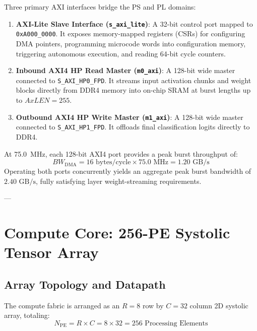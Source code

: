 \documentclass[10pt,journal,compsoc]{IEEEtran}
\begin{document}
Three primary AXI interfaces bridge the PS and PL domains:
\begin{enumerate}
    \item \textbf{AXI-Lite Slave Interface (\texttt{s\_axi\_lite})}: A 32-bit control port mapped to \texttt{0xA000\_0000}. It exposes memory-mapped registers (CSRs) for configuring DMA pointers, programming microcode words into configuration memory, triggering autonomous execution, and reading 64-bit cycle counters.
    \item \textbf{Inbound AXI4 HP Read Master (\texttt{m0\_axi})}: A 128-bit wide master connected to \texttt{S\_AXI\_HP0\_FPD}. It streams input activation chunks and weight blocks directly from DDR4 memory into on-chip SRAM at burst lengths up to $AxLEN=255$.
    \item \textbf{Outbound AXI4 HP Write Master (\texttt{m1\_axi})}: A 128-bit wide master connected to \texttt{S\_AXI\_HP1\_FPD}. It offloads final classification logits directly to DDR4.
\end{enumerate}

At 75.0~MHz, each 128-bit AXI4 port provides a peak burst throughput of:
\begin{equation}
BW_{\text{DMA}} = 16\text{ bytes/cycle} \times 75.0\text{ MHz} = 1.20\text{ GB/s}
\end{equation}
Operating both ports concurrently yields an aggregate peak burst bandwidth of $2.40\text{ GB/s}$, fully satisfying layer weight-streaming requirements.

---

\section{Compute Core: 256-PE Systolic Tensor Array}

\subsection{Array Topology and Datapath}
The compute fabric is arranged as an $R=8$ row by $C=32$ column 2D systolic array, totaling:
\begin{equation}
N_{\text{PE}} = R \times C = 8 \times 32 = 256\text{ Processing Elements}
\end{equation}
\end{document}
